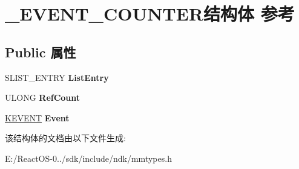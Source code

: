\hypertarget{struct___e_v_e_n_t___c_o_u_n_t_e_r}{}\section{\+\_\+\+E\+V\+E\+N\+T\+\_\+\+C\+O\+U\+N\+T\+E\+R结构体 参考}
\label{struct___e_v_e_n_t___c_o_u_n_t_e_r}
\subsection*{Public 属性}
\begin{DoxyCompactItemize}
\item 
\mbox{\label{struct___e_v_e_n_t___c_o_u_n_t_e_r_a0cba03261b2a7920bafb7d386a67138e}} 
S\+L\+I\+S\+T\+\_\+\+E\+N\+T\+RY {\bfseries List\+Entry}
\item 
\mbox{\label{struct___e_v_e_n_t___c_o_u_n_t_e_r_ab168e6c7f13d9e70164b351bd02e4969}} 
U\+L\+O\+NG {\bfseries Ref\+Count}
\item 
\mbox{\label{struct___e_v_e_n_t___c_o_u_n_t_e_r_a8db26245f6b86d18609da7f36efea3ee}} 
\hyperlink{struct___k_e_v_e_n_t}{K\+E\+V\+E\+NT} {\bfseries Event}
\end{DoxyCompactItemize}


该结构体的文档由以下文件生成\+:\begin{DoxyCompactItemize}
\item 
E\+:/\+React\+O\+S-\/0../sdk/include/ndk/mmtypes.\+h\end{DoxyCompactItemize}
